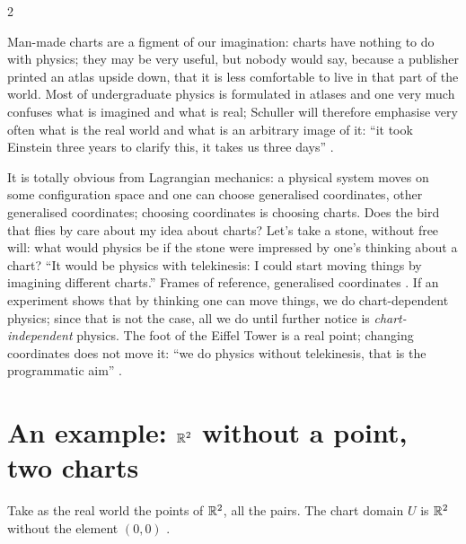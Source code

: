 \begin{paracol}{2}
\begin{coursenote}
Man-made charts are a figment of our imagination: charts have nothing to do with physics; they may be very useful, but nobody would say, because a publisher printed an atlas upside down, that it is less comfortable to live in that
part of the world. Most of undergraduate physics is formulated in atlases and one very much confuses what is imagined and what is real; Schuller will therefore emphasise very often what is the real world and what is an arbitrary image of it:
``it took Einstein three years to clarify this, it takes us three days'' .\par
It is totally obvious from Lagrangian mechanics: a physical system moves on some configuration space and one can choose generalised coordinates, other generalised coordinates; choosing coordinates is choosing charts. Does the bird that flies by care about
my idea about charts? Let's take a stone, without free will: what would physics be if the stone were impressed by one's thinking about a chart? ``It would be physics with telekinesis: I could start moving things by imagining different charts.'' Frames of reference,
generalised coordinates . If an experiment shows that by thinking one can move things, we do chart-dependent physics; since that is not the case, all we do until further notice is
\emph{chart-independent} physics. The foot of the Eiffel Tower is a real point; changing coordinates does not move it: ``we do physics without telekinesis, that is the programmatic aim'' .
\end{coursenote}

\section{An example: \texorpdfstring{$\mathbb{R}^2$}{R2} without a point, two charts}\label{sec:c02-r2}

Take as the real world the points of $\mathbb{R}^2$, all the pairs. The chart domain $U$ is $\mathbb{R}^2$ without the element $(0,0)$ .


\end{paracol}
